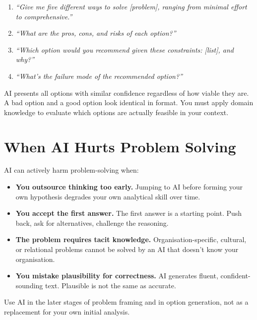 \begin{enumerate}
  \item \textit{``Give me five different ways to solve [problem], ranging from minimal effort to comprehensive.''}
  \item \textit{``What are the pros, cons, and risks of each option?''}
  \item \textit{``Which option would you recommend given these constraints: [list], and why?''}
  \item \textit{``What's the failure mode of the recommended option?''}
\end{enumerate}

\begin{warnbox}
AI presents all options with similar confidence regardless of how viable they are.
A bad option and a good option look identical in format.
You must apply domain knowledge to evaluate which options are actually feasible
in your context.
\end{warnbox}

\section{When AI Hurts Problem Solving}
\label{sec:ai-hurts}

AI can actively harm problem-solving when:

\begin{itemize}
  \item \textbf{You outsource thinking too early.} Jumping to AI before forming your
        own hypothesis degrades your own analytical skill over time.
  \item \textbf{You accept the first answer.} The first answer is a starting point.
        Push back, ask for alternatives, challenge the reasoning.
  \item \textbf{The problem requires tacit knowledge.} Organisation-specific, cultural,
        or relational problems cannot be solved by an AI that doesn't know your organisation.
  \item \textbf{You mistake plausibility for correctness.} AI generates fluent,
        confident-sounding text. Plausible is not the same as accurate.
\end{itemize}

Use AI in the later stages of problem framing and in option generation, not as a
replacement for your own initial analysis.
